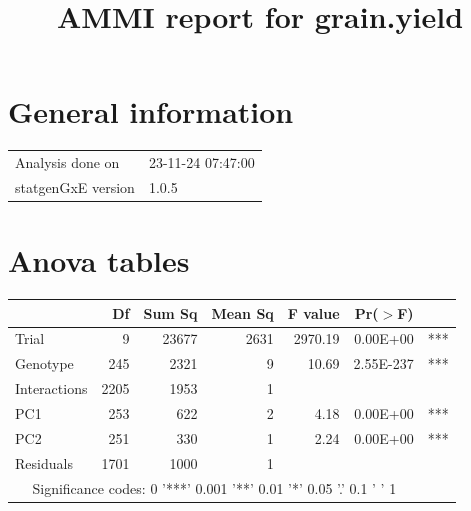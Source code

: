 \documentclass[a4paper,11pt]{article}\usepackage[]{graphicx}\usepackage[]{xcolor}
\title{AMMI report for grain.yield}%
\author{\vspace{-5ex}}
\date{\vspace{-5ex}}
\begin{document}
\maketitle
\singlespacing

\section{General information}

\begin{table}[ht]
\begin{flushleft}
\begin{tabular}{ll}
  Analysis done on & 23-11-24 07:47:00 \\ 
  statgenGxE version & 1.0.5 \\ 
  \end{tabular}
\label{general}
\end{flushleft}
\end{table}


\section{Anova tables}

\begin{table}[ht]
\begin{flushleft}
\label{anova}
\begin{tabular}{lrrrrrl}
  \hline
 & Df & Sum Sq & Mean Sq & F value & Pr($>$F) &  \\ 
  \hline
Trial & 9 & 23677 & 2631 & 2970.19 & 0.00E+00 & *** \\ 
  Genotype & 245 & 2321 & 9 & 10.69 & 2.55E-237 & *** \\ 
  Interactions & 2205 & 1953 & 1 &  &  &  \\ 
  PC1 & 253 & 622 & 2 & 4.18 & 0.00E+00 & *** \\ 
  PC2 & 251 & 330 & 1 & 2.24 & 0.00E+00 & *** \\ 
  Residuals & 1701 & 1000 & 1 &  &  &  \\ 
   \hline  \multicolumn{6}{c}{Significance codes: 0 '***' 0.001 '**' 0.01 '*' 0.05 '.' 0.1 ' ' 1 } \\ \hline
\end{tabular}
\end{flushleft}
\end{table}
\end{document}
